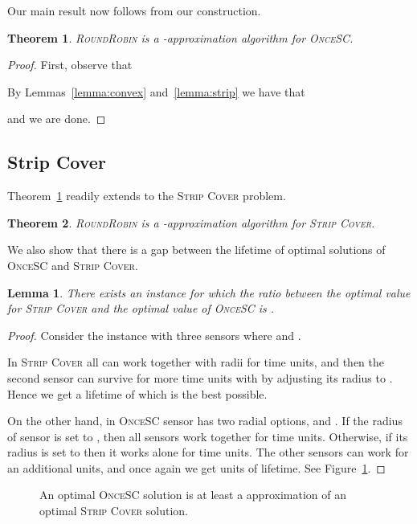 \documentclass[11pt]{article}
\newtheorem{lemma}{Lemma}
\newtheorem{theorem}{Theorem}
\newcommand{\strip}{\textsc{Strip Cover}\xspace}
\newcommand{\sosc}{\textsc{OnceSC}\xspace}
\newcommand{\rr}{\textsc{RoundRobin}\xspace}
\begin{document}
Our main result now follows from our construction. 

\begin{theorem}
\label{thm:main}
\rr is a -approximation algorithm for \sosc.
\end{theorem}
\begin{proof}
First, observe that 

By Lemmas~\ref{lemma:convex} and~\ref{lemma:strip} we have that

and we are done.
\end{proof}




\subsection{Strip Cover}


Theorem~\ref{thm:main} readily extends to the \strip problem. 

\begin{theorem}
\rr is a -approximation algorithm for \strip.
\end{theorem}


\iffalse 

We also show that there is a gap between the lifetime of optimal
solutions of \sosc and \strip.

\begin{lemma}
\label{lemma:general}
There exists an instance  for which the ratio between the
optimal value for \strip and the optimal value of \sosc is 
.
\end{lemma}
\begin{proof}Consider the instance with three sensors where  and .

In \strip all can work together with radii  for  time
units, and then the second sensor can survive for  more time units
with by adjusting its radius to .  Hence we get a lifetime of
 which is the best possible.

On the other hand, in \sosc sensor  has two radial options,
 and .  If the radius of sensor  is set to
, then all sensors work together for  time units.
Otherwise, if its radius is set to  then it works alone for 
time units.  The other sensors can work for an additional  units,
and once again we get  units of lifetime. See Figure~\ref{fig:sosc-gap}. 
\end{proof}

\begin{figure}[t]
\centering
\subfloat[]{}
\subfloat[]{}
\caption{An optimal \sosc solution is at least a  approximation of an optimal \strip solution.}
\label{fig:sosc-gap}
\end{figure}
\end{document}
